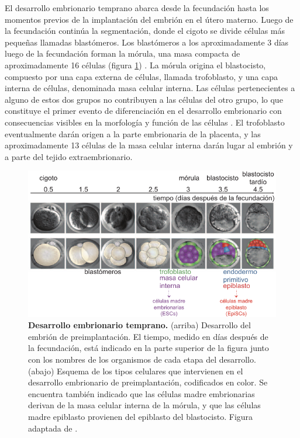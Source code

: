 \documentclass[./main.tex]{subfiles}
\begin{document}
El desarrollo embrionario temprano abarca desde la fecundación hasta los momentos previos de la implantación del embrión en el útero materno. Luego de la fecundación continúa la segmentación, donde el cigoto se divide células más pequeñas llamadas blastómeros. Los blastómeros a los aproximadamente 3 días luego de la fecundación forman la mórula, una masa compacta de aproximadamente 16 células (figura \ref{C1_fig:des_emb_temprano}) \cite{Gilbert2006}. La mórula origina el blastocisto, compuesto por una capa externa de células, llamada trofoblasto, y una capa interna de células, denominada masa celular interna. Las células pertenecientes a alguno de estos dos grupos no contribuyen a las células del otro grupo, lo que constituye el primer evento de diferenciación en el desarrollo embrionario con consecuencias visibles en la morfología y función de las células  \cite{Dyce1987,Fleming1987}. El trofoblasto eventualmente darán origen a la parte embrionaria de la placenta, y las aproximadamente 13 células de la masa celular interna darán lugar al embrión y a parte del tejido extraembrionario.  


\begin{figure}
    \centering
    \includegraphics[width=1\columnwidth]{figures/chapter1/C1_des_emb_temprano.pdf} 
    \caption{\textbf{Desarrollo embrionario temprano.} (arriba) Desarrollo del embrión de preimplantación. El tiempo, medido en días después de la fecundación, está indicado en la parte superior de la figura junto con los nombres de los organismos de cada etapa del desarrollo. (abajo) Esquema de los tipos celulares que intervienen en el desarrollo embrionario de preimplantación, codificados en color. Se encuentra también indicado que las células madre embrionarias derivan de la masa celular interna de la mórula, y que las células madre epiblasto provienen del epiblasto del blastocisto. Figura adaptada de \cite{Schrode2013}.}
    \label{C1_fig:des_emb_temprano}
\end{figure}
\end{document}
